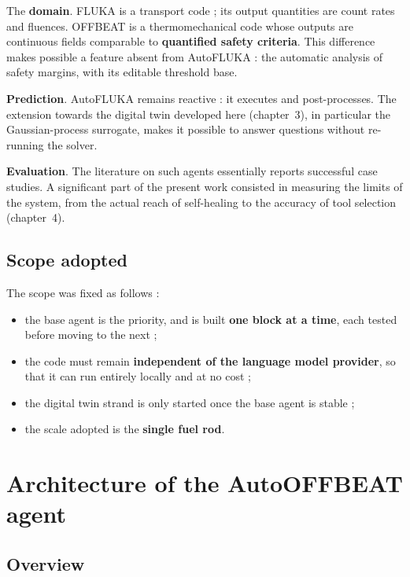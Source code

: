 \documentclass[12pt,a4paper]{report}
\begin{document}
The \textbf{domain}. FLUKA is a transport code ; its output quantities are count
rates and fluences. OFFBEAT is a thermomechanical code whose outputs are
continuous fields comparable to \textbf{quantified safety criteria}. This
difference makes possible a feature absent from AutoFLUKA : the automatic
analysis of safety margins, with its editable threshold base.

\textbf{Prediction}. AutoFLUKA remains reactive : it executes and post-processes.
The extension towards the digital twin developed here (chapter~3), in particular
the Gaussian-process surrogate, makes it possible to answer questions without
re-running the solver.

\textbf{Evaluation}. The literature on such agents essentially reports
successful case studies. A significant part of the present work consisted in
measuring the limits of the system, from the actual reach of self-healing to the
accuracy of tool selection (chapter~4).

\section{Scope adopted}

The scope was fixed as follows :
\begin{itemize}
  \item the base agent is the priority, and is built \textbf{one block at a
    time}, each tested before moving to the next ;
  \item the code must remain \textbf{independent of the language model
    provider}, so that it can run entirely locally and at no cost ;
  \item the digital twin strand is only started once the base agent is stable ;
  \item the scale adopted is the \textbf{single fuel rod}.
\end{itemize}

\clearpage
\chapter{Architecture of the AutoOFFBEAT agent}

\section{Overview}
\end{document}
